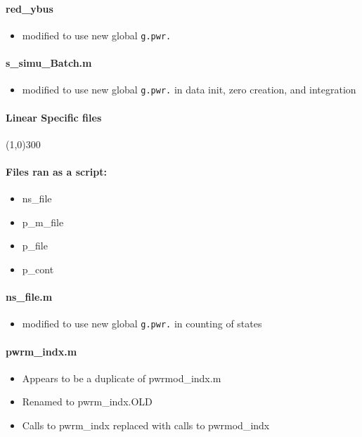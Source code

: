 \documentclass[12pt]{article}
\begin{document}
\paragraph{red\_ybus}
	\begin{itemize}
		\item modified to use new global \verb|g.pwr.|
	\end{itemize}
\paragraph{s\_simu\_Batch.m}
	\begin{itemize}
		\item modified to use new global \verb|g.pwr.| in data init, zero creation, and integration
	\end{itemize}
	

\paragraph{Linear Specific files}\line(1,0){300}

\paragraph{Files ran as a script:}
	\begin{itemize}
		\item ns\_file
		\item p\_m\_file
		\item p\_file
		\item p\_cont
	\end{itemize}
	
\paragraph{ns\_file.m}
	\begin{itemize}
		\item modified to use new global \verb|g.pwr.| in counting of states
	\end{itemize}
\paragraph{pwrm\_indx.m}
	\begin{itemize}
		\item Appears to be a duplicate of pwrmod\_indx.m
		\item Renamed to pwrm\_indx.OLD
		\item Calls to pwrm\_indx replaced with calls to pwrmod\_indx
	\end{itemize}
\end{document}
